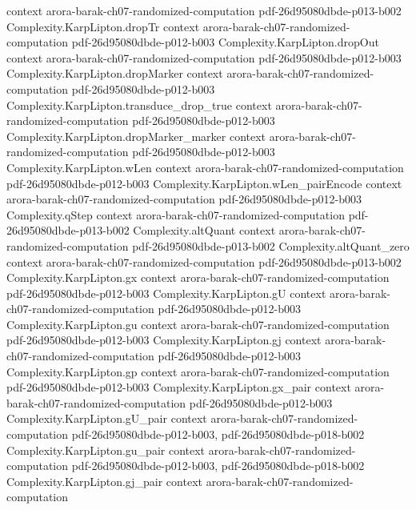 \begin{theorem}
  {context}
  {arora-barak-ch07-randomized-computation}
  {pdf-26d95080dbde-p013-b002}
\proofstep
  {Complexity.KarpLipton.dropTr}
  {context}
  {arora-barak-ch07-randomized-computation}
  {pdf-26d95080dbde-p012-b003}
\proofstep
  {Complexity.KarpLipton.dropOut}
  {context}
  {arora-barak-ch07-randomized-computation}
  {pdf-26d95080dbde-p012-b003}
\proofstep
  {Complexity.KarpLipton.dropMarker}
  {context}
  {arora-barak-ch07-randomized-computation}
  {pdf-26d95080dbde-p012-b003}
\proofstep
  {Complexity.KarpLipton.transduce_drop_true}
  {context}
  {arora-barak-ch07-randomized-computation}
  {pdf-26d95080dbde-p012-b003}
\proofstep
  {Complexity.KarpLipton.dropMarker_marker}
  {context}
  {arora-barak-ch07-randomized-computation}
  {pdf-26d95080dbde-p012-b003}
\proofstep
  {Complexity.KarpLipton.wLen}
  {context}
  {arora-barak-ch07-randomized-computation}
  {pdf-26d95080dbde-p012-b003}
\proofstep
  {Complexity.KarpLipton.wLen_pairEncode}
  {context}
  {arora-barak-ch07-randomized-computation}
  {pdf-26d95080dbde-p012-b003}
\proofstep
  {Complexity.qStep}
  {context}
  {arora-barak-ch07-randomized-computation}
  {pdf-26d95080dbde-p013-b002}
\proofstep
  {Complexity.altQuant}
  {context}
  {arora-barak-ch07-randomized-computation}
  {pdf-26d95080dbde-p013-b002}
\proofstep
  {Complexity.altQuant_zero}
  {context}
  {arora-barak-ch07-randomized-computation}
  {pdf-26d95080dbde-p013-b002}
\proofstep
  {Complexity.KarpLipton.gx}
  {context}
  {arora-barak-ch07-randomized-computation}
  {pdf-26d95080dbde-p012-b003}
\proofstep
  {Complexity.KarpLipton.gU}
  {context}
  {arora-barak-ch07-randomized-computation}
  {pdf-26d95080dbde-p012-b003}
\proofstep
  {Complexity.KarpLipton.gu}
  {context}
  {arora-barak-ch07-randomized-computation}
  {pdf-26d95080dbde-p012-b003}
\proofstep
  {Complexity.KarpLipton.gj}
  {context}
  {arora-barak-ch07-randomized-computation}
  {pdf-26d95080dbde-p012-b003}
\proofstep
  {Complexity.KarpLipton.gp}
  {context}
  {arora-barak-ch07-randomized-computation}
  {pdf-26d95080dbde-p012-b003}
\proofstep
  {Complexity.KarpLipton.gx_pair}
  {context}
  {arora-barak-ch07-randomized-computation}
  {pdf-26d95080dbde-p012-b003}
\proofstep
  {Complexity.KarpLipton.gU_pair}
  {context}
  {arora-barak-ch07-randomized-computation}
  {pdf-26d95080dbde-p012-b003,
    pdf-26d95080dbde-p018-b002}
\proofstep
  {Complexity.KarpLipton.gu_pair}
  {context}
  {arora-barak-ch07-randomized-computation}
  {pdf-26d95080dbde-p012-b003,
    pdf-26d95080dbde-p018-b002}
\proofstep
  {Complexity.KarpLipton.gj_pair}
  {context}
  {arora-barak-ch07-randomized-computation}

\end{theorem}
